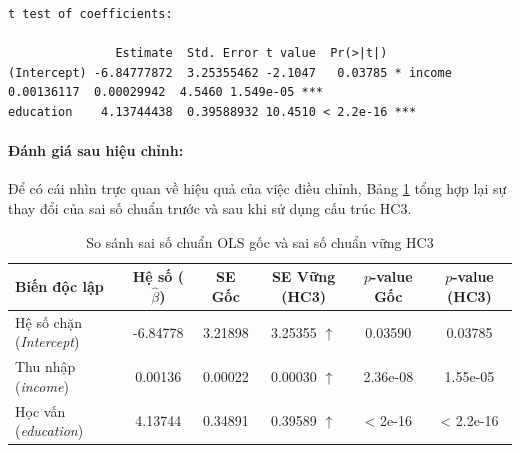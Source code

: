 \documentclass[12pt, a4paper]{article}
\begin{document}
\begin{verbatim}
t test of coefficients:

               Estimate  Std. Error t value  Pr(>|t|)    
(Intercept) -6.84777872  3.25355462 -2.1047   0.03785 * income       0.00136117  0.00029942  4.5460 1.549e-05 ***
education    4.13744438  0.39588932 10.4510 < 2.2e-16 ***
\end{verbatim}

	\paragraph{Đánh giá sau hiệu chỉnh:} 
	Để có cái nhìn trực quan về hiệu quả của việc điều chỉnh, Bảng \ref{tab:robust_comparison} tổng hợp lại sự thay đổi của sai số chuẩn trước và sau khi sử dụng cấu trúc HC3.
	
	\begin{table}[H]
		\centering
		\caption{So sánh sai số chuẩn OLS gốc và sai số chuẩn vững HC3}
		\label{tab:robust_comparison}
		\small
		\renewcommand{\arraystretch}{1.2}
		\begin{tabular}{lccccc}
			\toprule
			\textbf{Biến độc lập} & \textbf{Hệ số ($\hat{\beta}$)} & \textbf{SE Gốc} & \textbf{SE Vững (HC3)} & \textbf{$p$-value Gốc} & \textbf{$p$-value (HC3)} \\
			\midrule
			Hệ số chặn (\textit{Intercept}) & -6.84778 & 3.21898 & 3.25355 $\uparrow$ & 0.03590 & 0.03785 \\
			Thu nhập (\textit{income})      &  0.00136 & 0.00022 & 0.00030 $\uparrow$ & 2.36e-08 & 1.55e-05 \\
			Học vấn (\textit{education})    &  4.13744 & 0.34891 & 0.39589 $\uparrow$ & < 2e-16  & < 2.2e-16 \\
			\bottomrule
		\end{tabular}
	\end{table}
\end{document}
